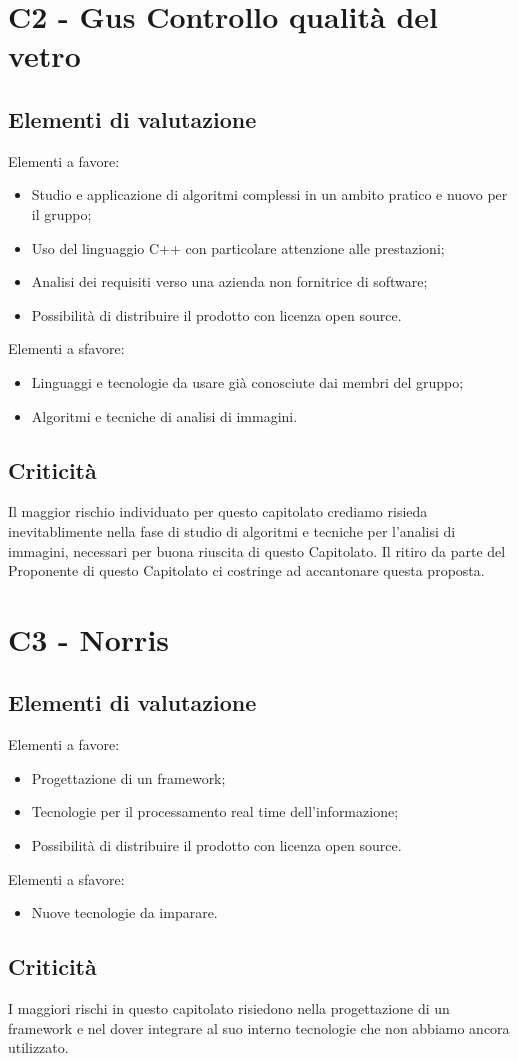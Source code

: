 \section{C2 - Gus Controllo qualità del vetro}{
	\subsection{Elementi di valutazione}{
		Elementi a favore:
		\begin{itemize}
			\item Studio e applicazione di algoritmi complessi in un ambito pratico e nuovo per il gruppo;
			\item Uso del linguaggio C++ con particolare attenzione alle prestazioni;
			\item Analisi dei requisiti verso una azienda non fornitrice di software;
			\item Possibilità di distribuire il prodotto con licenza open source.
		\end{itemize}
		
		Elementi a sfavore:
		\begin{itemize}
			\item Linguaggi e tecnologie da usare già conosciute dai membri del gruppo;
			\item Algoritmi e tecniche di analisi di immagini.
		\end{itemize}
	}
	\subsection{Criticità}{
		Il maggior rischio individuato per questo capitolato crediamo risieda inevitablimente nella fase di studio di algoritmi e tecniche per l'analisi di immagini, necessari per buona riuscita di questo Capitolato.
		Il ritiro da parte del Proponente di questo Capitolato ci costringe ad accantonare questa proposta.
	}
}
\section{C3 - Norris}{
	\subsection{Elementi di valutazione}{
		Elementi a favore:
		\begin{itemize}
			\item Progettazione di un framework;
			\item Tecnologie per il processamento real time dell'informazione;
			\item Possibilità di distribuire il prodotto con licenza open source.
		\end{itemize}
		
		Elementi a sfavore:
		\begin{itemize}
			\item Nuove tecnologie da imparare.
		\end{itemize}
	}
	\subsection{Criticità}{
		I maggiori rischi in questo capitolato risiedono nella progettazione di un framework e nel dover integrare al suo interno tecnologie che non abbiamo ancora utilizzato.
	}
}
